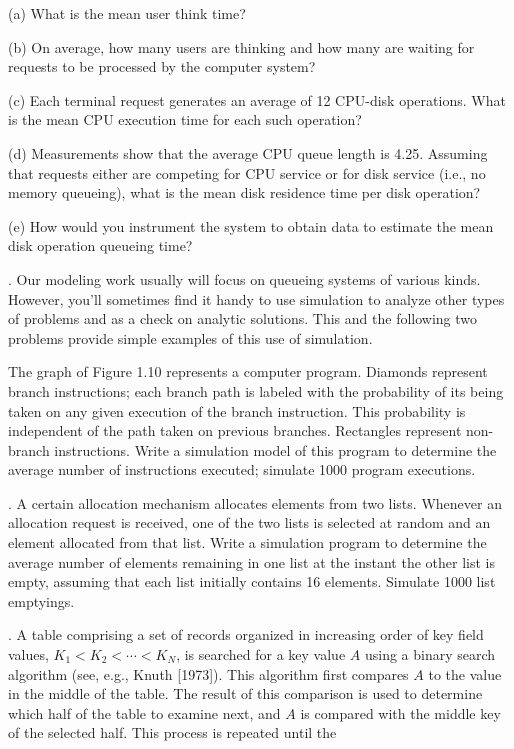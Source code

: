 \noindent (a) What is the mean user think time?

\noindent (b) On average, how many users are thinking and how many are waiting for
requests to be processed by the computer system?

\noindent (c) Each terminal request generates an average of 12 CPU-disk operations.
What is the mean CPU execution time for each such operation?

\noindent (d) Measurements show that the average CPU queue length is 4.25.
Assuming that requests either are competing for CPU service or for disk service
(i.e., no memory queueing), what is the mean disk residence time per disk operation?

\noindent (e) How would you instrument the system to obtain data to estimate the
mean disk operation queueing time?

. Our modeling work usually will focus on queueing systems of various
kinds. However, you'll sometimes find it handy to use simulation to analyze other
types of problems and as a check on analytic solutions. This and the following two
problems provide simple examples of this use of simulation.

The graph of Figure 1.10 represents a computer program. Diamonds represent branch
instructions; each branch path is labeled with the probability of its being taken
on any given execution of the branch instruction. This probability is independent
of the path taken on previous branches. Rectangles represent non-branch
instructions. Write a simulation model of this program to determine the average
number of instructions executed; simulate 1000 program executions.

. A certain allocation mechanism allocates elements from two lists.
Whenever an allocation request is received, one of the two lists is selected at
random and an element allocated from that list. Write a simulation program to
determine the average number of elements remaining in one list at the instant the
other list is empty, assuming that each list initially contains 16 elements.
Simulate 1000 list emptyings.

. A table comprising a set of records organized in increasing order of
key field values, $K_1<K_2<\cdots<K_N$, is searched for a key value $A$ using a
binary search algorithm (see, e.g., Knuth [1973]). This algorithm first compares
$A$ to the value in the middle of the table. The result of this comparison is used
to determine which half of the table to examine next, and $A$ is compared with
the middle key of the selected half. This process is repeated until the

